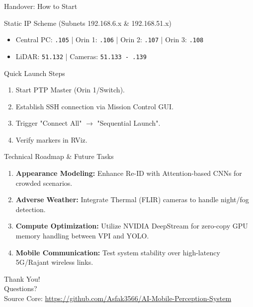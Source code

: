 \documentclass[pdf, 10pt]{beamer}
\begin{document}
\begin{frame}{Handover: How to Start}
    \begin{block}{Static IP Scheme (Subnets 192.168.6.x & 192.168.51.x)}
        \begin{itemize}
            \item Central PC: \texttt{.105} | Orin 1: \texttt{.106} | Orin 2: \texttt{.107} | Orin 3: \texttt{.108}
            \item LiDAR: \texttt{51.132} | Cameras: \texttt{51.133 - .139}
        \end{itemize}
    \end{block}
    \begin{block}{Quick Launch Steps}
        \begin{enumerate}
            \item Start PTP Master (Orin 1/Switch).
            \item Establish SSH connection via Mission Control GUI.
            \item Trigger "Connect All" $\rightarrow$ "Sequential Launch".
            \item Verify markers in RViz.
        \end{enumerate}
    \end{block}
\end{frame}

\begin{frame}{Technical Roadmap & Future Tasks}
    \begin{enumerate}
        \item \textbf{Appearance Modeling:} Enhance Re-ID with Attention-based CNNs for crowded scenarios.
        \item \textbf{Adverse Weather:} Integrate Thermal (FLIR) cameras to handle night/fog detection.
        \item \textbf{Compute Optimization:} Utilize NVIDIA DeepStream for zero-copy GPU memory handling between VPI and YOLO.
        \item \textbf{Mobile Communication:} Test system stability over high-latency 5G/Rajant wireless links.
    \end{enumerate}
\end{frame}

\begin{frame}
    \centering
    \Huge Thank You! \\
    \vspace{1cm}
    \Large Questions? \\
    \vspace{1cm}
    \small Source Core: \url{https://github.com/Asfak3566/AI-Mobile-Perception-System}
\end{frame}
\end{document}
